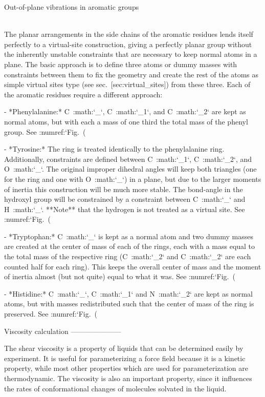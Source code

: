 Out-of-plane vibrations in aromatic groups
~~~~~~~~~~~~~~~~~~~~~~~~~~~~~~~~~~~~~~~~~~

The planar arrangements in the side chains of the aromatic residues
lends itself perfectly to a virtual-site construction, giving a
perfectly planar group without the inherently unstable constraints that
are necessary to keep normal atoms in a plane. The basic approach is to
define three atoms or dummy masses with constraints between them to fix
the geometry and create the rest of the atoms as simple virtual sites
type (see sec. [sec:virtual\_sites]) from these three. Each of the
aromatic residues require a different approach:

-  *Phenylalanine:* C\ :math:`_\gamma`,
   C\ :math:`_{{\epsilon}1}`, and
   C\ :math:`_{{\epsilon}2}` are kept as normal atoms,
   but with each a mass of one third the total mass of the phenyl group.
   See :numref:`Fig. (%

-  *Tyrosine:* The ring is treated identically to the phenylalanine
   ring. Additionally, constraints are defined between
   C\ :math:`_{{\epsilon}1}`,
   C\ :math:`_{{\epsilon}2}`, and
   O\ :math:`_{\eta}`. The original improper dihedral
   angles will keep both triangles (one for the ring and one with
   O\ :math:`_{\eta}`) in a plane, but due to the larger
   moments of inertia this construction will be much more stable. The
   bond-angle in the hydroxyl group will be constrained by a constraint
   between C\ :math:`_\gamma` and
   H\ :math:`_{\eta}`. **Note** that the hydrogen is not
   treated as a virtual site. See
   :numref:`Fig. (%

-  *Tryptophan:* C\ :math:`_\beta` is kept as a normal
   atom and two dummy masses are created at the center of mass of each
   of the rings, each with a mass equal to the total mass of the
   respective ring (C\ :math:`_{{\delta}2}` and
   C\ :math:`_{{\epsilon}2}` are each counted half for
   each ring). This keeps the overall center of mass and the moment of
   inertia almost (but not quite) equal to what it was. See
   :numref:`Fig. (%

-  *Histidine:* C\ :math:`_\gamma`,
   C\ :math:`_{{\epsilon}1}` and
   N\ :math:`_{{\epsilon}2}` are kept as normal atoms,
   but with masses redistributed such that the center of mass of the
   ring is preserved. See :numref:`Fig. (%

Viscosity calculation
---------------------

The shear viscosity is a property of liquids that can be determined
easily by experiment. It is useful for parameterizing a force field
because it is a kinetic property, while most other properties which are
used for parameterization are thermodynamic. The viscosity is also an
important property, since it influences the rates of conformational
changes of molecules solvated in the liquid.

